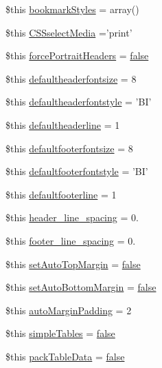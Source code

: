 \begin{DoxyCompactItemize}
\item 
\$this \hyperlink{config_8php_acd1103127437498842ed659057cd8c62}{bookmark\-Styles} = array()
\item 
\$this \hyperlink{config_8php_a0a16123dfb4adc12bbe121ca999d348f}{C\-S\-Sselect\-Media} ='print'
\item 
\$this \hyperlink{config_8php_aba0968aa1b8a40c171e109e1b36064a1}{force\-Portrait\-Headers} = \hyperlink{ttfontsuni_8php_afbaa04e5cc97693dc668b3c45d3dd740}{false}
\item 
\$this \hyperlink{config_8php_af0538a4cd39d6b29631562f6cf6ad0d1}{defaultheaderfontsize} = 8
\item 
\$this \hyperlink{config_8php_ae9b7882a698124ad57d7a3b5c110845a}{defaultheaderfontstyle} = 'B\-I'
\item 
\$this \hyperlink{config_8php_ae0c7711b2bb112bdec75418230ad9c4b}{defaultheaderline} = 1
\item 
\$this \hyperlink{config_8php_ab8d89980f561d7b226fddbef8cf3c90e}{defaultfooterfontsize} = 8
\item 
\$this \hyperlink{config_8php_ad3eb3a529bacf404886ef883fd302409}{defaultfooterfontstyle} = 'B\-I'
\item 
\$this \hyperlink{config_8php_add5199377de392dea91abf4872cb208f}{defaultfooterline} = 1
\item 
\$this \hyperlink{config_8php_a95e89f0ed77e9327ba63d8af50837d89}{header\-\_\-line\-\_\-spacing} = 0.
\item 
\$this \hyperlink{config_8php_a7c42414bb054bea7d58089514c4d2043}{footer\-\_\-line\-\_\-spacing} = 0.
\item 
\$this \hyperlink{config_8php_abb6802e13edcab8d25add411772cbf4d}{set\-Auto\-Top\-Margin} = \hyperlink{ttfontsuni_8php_afbaa04e5cc97693dc668b3c45d3dd740}{false}
\item 
\$this \hyperlink{config_8php_aa5ce0e4a17ae148ff2e65f361489c6e6}{set\-Auto\-Bottom\-Margin} = \hyperlink{ttfontsuni_8php_afbaa04e5cc97693dc668b3c45d3dd740}{false}
\item 
\$this \hyperlink{config_8php_a96413d9f2536e015ab6e9aa606d776f1}{auto\-Margin\-Padding} = 2
\item 
\$this \hyperlink{config_8php_a58afad1e5917c6e1efa081a242319daf}{simple\-Tables} = \hyperlink{ttfontsuni_8php_afbaa04e5cc97693dc668b3c45d3dd740}{false}
\item 
\$this \hyperlink{config_8php_a96bae70a0455ce2669d778748f78b890}{pack\-Table\-Data} = \hyperlink{ttfontsuni_8php_afbaa04e5cc97693dc668b3c45d3dd740}{false}
\item 

\end{DoxyCompactItemize}
